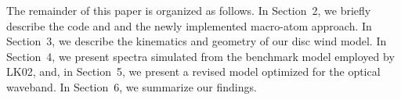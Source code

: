The remainder of this paper is organized as follows. In Section~2, we
briefly describe the code and and the newly implemented macro-atom
approach. In Section~3, we describe the kinematics and geometry of our
disc wind model. In Section~4, we present spectra simulated 
from the benchmark model
employed by LK02, and, in Section~5, we present a revised model
optimized for the optical waveband. In Section~6, we summarize our
findings.


%
%







